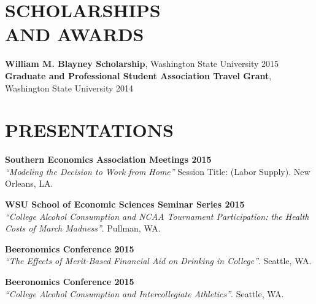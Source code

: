 \documentclass[margin]{res}  %
\begin{document}
\begin{resume}
%


\section{\textnormal{SCHOLARSHIPS\\AND AWARDS}}
\textbf{William M. Blayney Scholarship}, Washington State University \hfill 2015 \\[12pt]
\textbf{Graduate and Professional Student Association Travel Grant},\\ Washington State University \hfill 2014 \\


\section{\textnormal{PRESENTATIONS}}

\textbf{Southern Economics Association Meetings 2015}\\
\emph{``Modeling the Decision to Work from Home''}
Session Title: (Labor Supply). New Orleans, LA. %

\textbf{WSU School of Economic Sciences Seminar Series 2015}\\
\emph{``College Alcohol Consumption and NCAA Tournament Participation: the Health Costs of March Madness''}. Pullman, WA. %

\textbf{Beeronomics Conference 2015}\\
\emph{``The Effects of Merit-Based Financial Aid on Drinking in College''}. Seattle, WA. %

\textbf{Beeronomics Conference 2015}\\
\emph{``College Alcohol Consumption and Intercollegiate Athletics''}. Seattle, WA. %


\end{resume}
\end{document}
